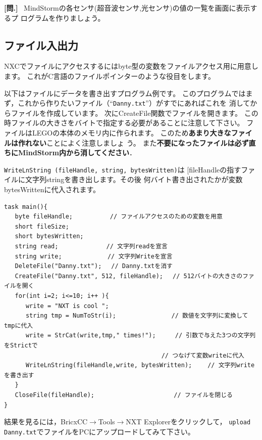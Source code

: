 \documentclass[11pt]{jarticle}
\makeatletter
\newcounter{qnum}[section]
\def\theqnum{問\thesection.\the\c@qnum}
\def\question{\refstepcounter{qnum}%
  \vspace{3mm}\noindent\textbf{[\theqnum]}~}
\def\nmindex{\@ifnextchar[{\@nmindex}{\@@nmindex}}
\def\@nmindex[#1]#2{#2\index{#1@#2}}
\def\@@nmindex#1{#1\index{#1}}
\makeatother
\begin{document}
\question
MindStormの各センサ(超音波センサ,光センサ)の値の一覧を画面に表示するプ
ログラムを作りましょう。

\subsection{ファイル入出力}


NXCでファイルにアクセスするにはbyte型の変数をファイルアクセス用に用意します。
これがC言語のファイルポインターのような役目をします。

以下はファイルにデータを書き出すプログラム例です。
このプログラムではまず，これから作りたいファイル（``\verb|Danny.txt|''）がすでにあればこれを
消してからファイルを作成しています。
次にCreateFile関数でファイルを開きます。
この時ファイルの大きさをバイトで指定する必要があることに注意して下さい。
ファイルはLEGOの本体のメモリ内に作られます。
このため\textbf{あまり大きなファイルは作れない}ことによく注意しましょ
う。
また\textbf{不要になったファイルは必ず直ちにMindStorm内から消してください}．

\verb|WriteLnString (fileHandle, string, bytesWritten)|は
\nmindex{fileHandle}の指すファイルに文字列stringを書き出します。その後
何バイト書き出されたかが変数bytesWrittenに代入されます。

\begin{screen}{\small
\begin{verbatim}
task main(){ 
   byte fileHandle;　　　　　  // ファイルアクセスのための変数を用意 
   short fileSize; 
   short bytesWritten; 
   string read;　　　　　　　　// 文字列readを宣言 
   string write; 　　　　　　　// 文字列Writeを宣言
   DeleteFile("Danny.txt"); 　// Danny.txtを消す
   CreateFile("Danny.txt", 512, fileHandle);　 // 512バイトの大きさのファイルを開く
   for(int i=2; i<=10; i++ ){ 
      write = "NXT is cool "; 
      string tmp = NumToStr(i); 　　　　　      // 数値を文字列に変換してtmpに代入
      write = StrCat(write,tmp," times!"); 　　 // 引数で与えた3つの文字列をStrictで
      　　　　　　　　　　　　　　　　　　　　　　 // つなげて変数writeに代入
      WriteLnString(fileHandle,write, bytesWritten); 　　// 文字列writeを書き出す
   } 
   CloseFile(fileHandle); 　　　                // ファイルを閉じる
} 
\end{verbatim}}
\end{screen}


結果を見るには，BricxCC$\rightarrow$Tools$\rightarrow$NXT Explorerをクリックして，
\verb|upload Danny.txt|でファイルをPCにアップロードしてみて下さい。
\end{document}
